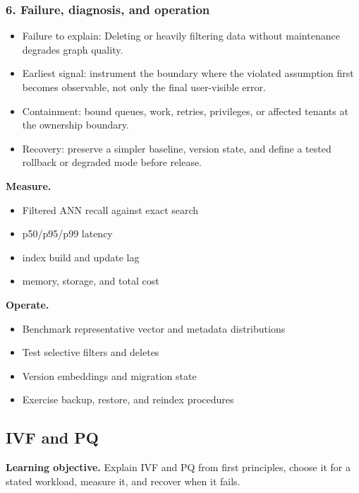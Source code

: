 \subsubsection*{6. Failure, diagnosis, and operation}
\begin{itemize}
\item Failure to explain: Deleting or heavily filtering data without maintenance degrades graph quality.
\item Earliest signal: instrument the boundary where the violated assumption first becomes observable, not only the final user-visible error.
\item Containment: bound queues, work, retries, privileges, or affected tenants at the ownership boundary.
\item Recovery: preserve a simpler baseline, version state, and define a tested rollback or degraded mode before release.
\end{itemize}
\textbf{Measure.}\begin{itemize}
\item Filtered ANN recall against exact search
\item p50/p95/p99 latency
\item index build and update lag
\item memory, storage, and total cost
\end{itemize}
\textbf{Operate.}\begin{itemize}
\item Benchmark representative vector and metadata distributions
\item Test selective filters and deletes
\item Version embeddings and migration state
\item Exercise backup, restore, and reindex procedures
\end{itemize}
\subsection{IVF and PQ}
\textbf{Learning objective.} Explain IVF and PQ from first principles, choose it for a stated workload, measure it, and recover when it fails.
